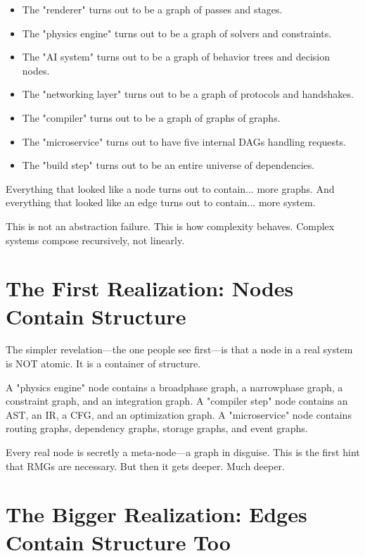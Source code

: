 \begin{itemize}
    \item The "renderer" turns out to be a graph of passes and stages.
    \item The "physics engine" turns out to be a graph of solvers and constraints.
    \item The "AI system" turns out to be a graph of behavior trees and decision nodes.
    \item The "networking layer" turns out to be a graph of protocols and handshakes.
    \item The "compiler" turns out to be a graph of graphs of graphs.
    \item The "microservice" turns out to have five internal DAGs handling requests.
    \item The "build step" turns out to be an entire universe of dependencies.
\end{itemize}

Everything that looked like a node turns out to contain... more graphs. And everything that looked like an edge turns out to contain... more system.

This is not an abstraction failure. This is how complexity behaves. Complex systems compose recursively, not linearly.

\section{The First Realization: Nodes Contain Structure}
\label{sec:nodes-contain-structure}

The simpler revelation—the one people see first—is that a node in a real system is NOT atomic. It is a container of structure.

A "physics engine" node contains a broadphase graph, a narrowphase graph, a constraint graph, and an integration graph. A "compiler step" node contains an AST, an IR, a CFG, and an optimization graph. A "microservice" node contains routing graphs, dependency graphs, storage graphs, and event graphs.

Every real node is secretly a meta-node—a graph in disguise. This is the first hint that RMGs are necessary. But then it gets deeper. Much deeper.

\section{The Bigger Realization: Edges Contain Structure Too}
\label{sec:edges-contain-structure}

